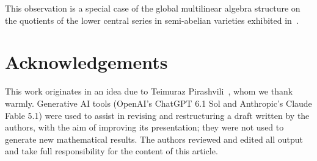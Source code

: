 \documentclass[reqno,a4paper]{amsart}
\theoremstyle{plain}
\theoremstyle{definition}
\begin{document}
This observation is a special case of the global multilinear algebra structure on the quotients of the lower central series in semi-abelian varieties exhibited in~\cite{CCC}.


\section*{Acknowledgements}
This work originates in an idea due to Teimuraz Pirashvili~\cite{Pirashvili-Square-Rings}, whom we thank warmly. Generative AI tools (OpenAI's ChatGPT 6.1 Sol and Anthropic's Claude Fable 5.1) were used to assist in revising and restructuring a draft written by the authors, with the aim of improving its presentation; they were not used to generate new mathematical results. The authors reviewed and edited all output and take full responsibility for the content of this article.



\end{document}
